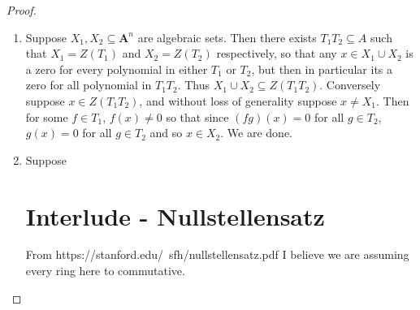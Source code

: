 \documentclass{report}
\providecommand{\A}{\textbf{A}}
\begin{document}
  \begin{proof}
    \begin{enumerate}
    \item Suppose $X_{1},X_2\subseteq \A^n$ are algebraic sets. Then there exists $T_1T_2\subseteq A$ such that $X_1=Z(T_1)$ and $X_2=Z(T_2)$ respectively, so that any $x\in X_1\cup X_2$ is a zero for every polynomial in either $T_1$ or $T_2$, but then in particular its a zero for all polynomial in $T_1T_2$. Thus $X_1\cup X_2\subseteq Z(T_1T_2)$. Conversely suppose $x\in Z(T_{1}T_{2})$, and without loss of generality suppose $x\neq X_{1}$. Then for some $f\in T_{1}$, $f(x)\neq 0$ so that since $(fg)(x)=0$ for all $g\in T_{2}$, $g(x)=0$ for all $g\in T_{2}$ and so $x\in X_2$. We are done.

      \item Suppose 

  
  \section{Interlude - Nullstellensatz}
  From https://stanford.edu/~sfh/nullstellensatz.pdf
  I believe we are assuming every ring here to commutative.

\end{enumerate}
\end{proof}
\end{document}
